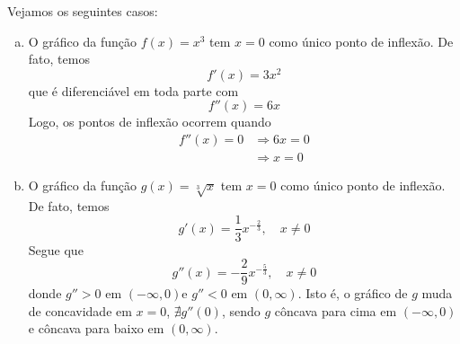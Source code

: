 \cleardoublepage\documentclass[../main.tex]{subfiles}
\begin{document}
\begin{ex}
  Vejamos os seguintes casos:
  \begin{enumerate}[a)]
  \item O gráfico da função $f(x) = x^3$ tem $x=0$ como único ponto de inflexão. De fato, temos
    \begin{equation*}
      f'(x) = 3x^2
    \end{equation*}
    que é diferenciável em toda parte com
    \begin{equation*}
      f''(x) = 6x
    \end{equation*}
    Logo, os pontos de inflexão ocorrem quando
    \begin{align*}
      f''(x) = 0 &\Rightarrow 6x = 0 \\
                 &\Rightarrow x = 0
    \end{align*}
  \item O gráfico da função $g(x) = \sqrt[3]{x}$ tem $x=0$ como único ponto de inflexão. De fato, temos
    \begin{equation*}
      g'(x) = \frac{1}{3}x^{-\frac{2}{3}},\quad x\neq 0
    \end{equation*}
    Segue que
    \begin{equation*}
      g''(x) = -\frac{2}{9}x^{-\frac{5}{3}},\quad x\neq 0
    \end{equation*}
    donde $g'' > 0$ em $(-\infty, 0)$e $g'' < 0$ em $(0, \infty)$. Isto é, o gráfico de $g$ muda de concavidade em $x=0$, $\nexists g''(0)$, sendo $g$ côncava para cima em $(-\infty, 0)$ e côncava para baixo em $(0, \infty)$.
\end{enumerate}
\end{ex}
\end{document}
